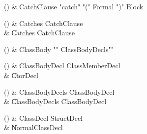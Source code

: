 \begin{bbgrammarappendix}

() & CatchClause \label{prod:CatchClause}  \: \xcd"catch" \xcd"(" Formal \xcd")" Block  \\


\end{bbgrammarappendix}

\begin{bbgrammarappendix}

() & Catches \label{prod:Catches}  \: CatchClause  \\

 &    \| Catches CatchClause \\

\end{bbgrammarappendix}

\begin{bbgrammarappendix}

() & ClassBody \label{prod:ClassBody}  \: \xcd"{" ClassBodyDecls\opt \xcd"}"  \\


\end{bbgrammarappendix}

\begin{bbgrammarappendix}

() & ClassBodyDecl \label{prod:ClassBodyDecl}  \: ClassMemberDecl  \\

 &    \| CtorDecl \\

\end{bbgrammarappendix}

\begin{bbgrammarappendix}

() & ClassBodyDecls \label{prod:ClassBodyDecls}  \: ClassBodyDecl  \\

 &    \| ClassBodyDecls ClassBodyDecl \\

\end{bbgrammarappendix}

\begin{bbgrammarappendix}

() & ClassDecl \label{prod:ClassDecl}  \: StructDecl  \\

 &    \| NormalClassDecl \\

\end{bbgrammarappendix}

